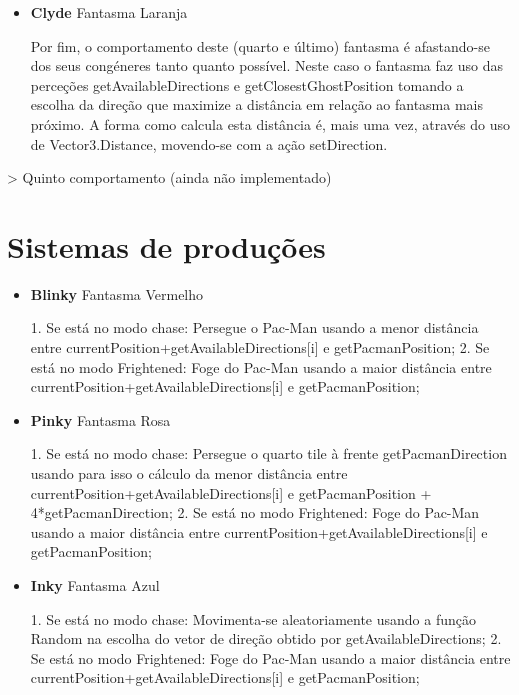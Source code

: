 \documentclass{article}
\begin{document}
\begin{itemize}
    \item \textbf{Clyde} {Fantasma Laranja}
    
    Por fim, o comportamento deste (quarto e último) fantasma é afastando-se dos
seus congéneres tanto quanto possível. Neste caso o fantasma faz uso das
perceções getAvailableDirections e getClosestGhostPosition tomando a
escolha da direção que maximize a distância em relação ao fantasma mais
próximo. A forma como calcula esta distância é, mais uma vez, através do uso de
Vector3.Distance, movendo-se com a ação setDirection.
\end{itemize}

>  Quinto comportamento (ainda não implementado)


\section{Sistemas de produções}

\begin{itemize}
    \item \textbf{Blinky} {Fantasma Vermelho}

    1. Se está no modo chase: Persegue o Pac-Man usando a menor distância entre
currentPosition+getAvailableDirections[i] e getPacmanPosition;
    2. Se está no modo Frightened: Foge do Pac-Man usando a maior distância entre
currentPosition+getAvailableDirections[i] e getPacmanPosition;
\end{itemize}
 
\begin{itemize}
    \item \textbf{Pinky} {Fantasma Rosa}

    1. Se está no modo chase: Persegue o quarto tile à frente getPacmanDirection
usando para isso o cálculo da menor distância entre
currentPosition+getAvailableDirections[i] e getPacmanPosition
+ 4*getPacmanDirection;
    2. Se está no modo Frightened: Foge do Pac-Man usando a maior distância entre
currentPosition+getAvailableDirections[i] e getPacmanPosition;
\end{itemize}

\begin{itemize}
    \item \textbf{Inky} {Fantasma Azul}

    1. Se está no modo chase: Movimenta-se aleatoriamente usando a função
Random na escolha do vetor de direção obtido por getAvailableDirections;
    2. Se está no modo Frightened: Foge do Pac-Man usando a maior distância entre
currentPosition+getAvailableDirections[i] e getPacmanPosition;
\end{itemize}
\end{document}
